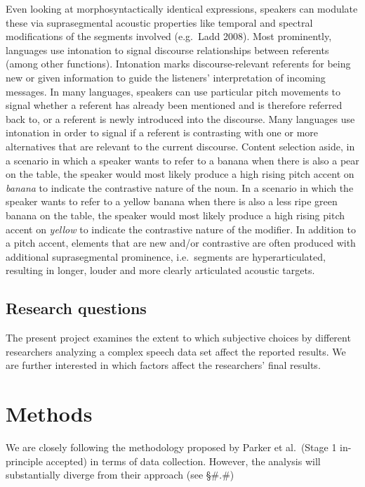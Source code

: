 \documentclass[
  english,
  man,floatsintext]{apa6}
\begin{document}
Even looking at morphosyntactically identical expressions, speakers can modulate these via suprasegmental acoustic properties like temporal and spectral modifications of the segments involved (e.g.~Ladd 2008).
Most prominently, languages use intonation to signal discourse relationships between referents (among other functions).
Intonation marks discourse-relevant referents for being new or given information to guide the listeners' interpretation of incoming messages.
In many languages, speakers can use particular pitch movements to signal whether a referent has already been mentioned and is therefore referred back to, or a referent is newly introduced into the discourse.
Many languages use intonation in order to signal if a referent is contrasting with one or more alternatives that are relevant to the current discourse.
Content selection aside, in a scenario in which a speaker wants to refer to a banana when there is also a pear on the table, the speaker would most likely produce a high rising pitch accent on \emph{banana} to indicate the contrastive nature of the noun.
In a scenario in which the speaker wants to refer to a yellow banana when there is also a less ripe green banana on the table, the speaker would most likely produce a high rising pitch accent on \emph{yellow} to indicate the contrastive nature of the modifier.
In addition to a pitch accent, elements that are new and/or contrastive are often produced with additional suprasegmental prominence, i.e.~segments are hyperarticulated, resulting in longer, louder and more clearly articulated acoustic targets.

\hypertarget{research-questions}{%
\subsection{Research questions}\label{research-questions}}

The present project examines the extent to which subjective choices by different researchers analyzing a complex speech data set affect the reported results.
We are further interested in which factors affect the researchers' final results.

\hypertarget{methods}{%
\section{Methods}\label{methods}}

We are closely following the methodology proposed by Parker et al.~(Stage 1 in-principle accepted) in terms of data collection.
However, the analysis will substantially diverge from their approach (see §\#.\#)
\end{document}
